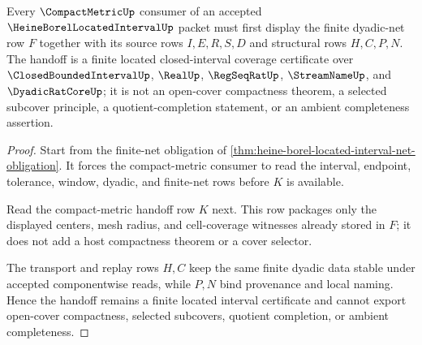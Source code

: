 \begin{theorem}
\label{thm:heine-borel-located-interval-compact-metric-handoff}
Every $\CompactMetricUp$ consumer of an accepted $\HeineBorelLocatedIntervalUp$ packet must first display the finite dyadic-net row $F$ together with its source rows $I,E,R,S,D$ and structural rows $H,C,P,N$. The handoff is a finite located closed-interval coverage certificate over $\ClosedBoundedIntervalUp$, $\RealUp$, $\RegSeqRatUp$, $\StreamNameUp$, and $\DyadicRatCoreUp$; it is not an open-cover compactness theorem, a selected subcover principle, a quotient-completion statement, or an ambient completeness assertion.
\end{theorem}
\begin{proof}
Start from the finite-net obligation of \autoref{thm:heine-borel-located-interval-net-obligation}. It forces the compact-metric consumer to read the interval, endpoint, tolerance, window, dyadic, and finite-net rows before $K$ is available.

Read the compact-metric handoff row $K$ next. This row packages only the displayed centers, mesh radius, and cell-coverage witnesses already stored in $F$; it does not add a host compactness theorem or a cover selector.

The transport and replay rows $H,C$ keep the same finite dyadic data stable under accepted componentwise reads, while $P,N$ bind provenance and local naming. Hence the handoff remains a finite located interval certificate and cannot export open-cover compactness, selected subcovers, quotient completion, or ambient completeness.
\end{proof}



